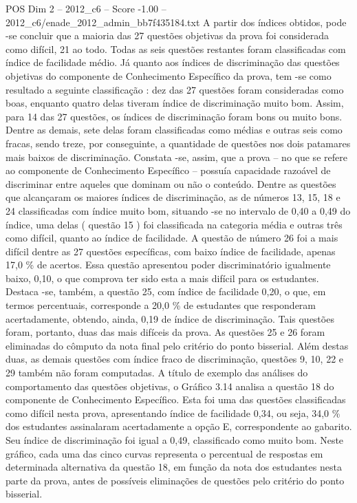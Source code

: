 \begin{textsample}{POS Dim 2 – 2012\_c6 – Score -1.00 – 2012\_c6/enade\_2012\_admin\_bb7f435184.txt}
A partir dos índices obtidos, pode -se concluir que a maioria das 27 questões objetivas da prova foi considerada como difícil, 21 ao todo.
Todas as seis questões restantes foram classificadas com índice de facilidade médio.
Já quanto aos índices de discriminação das questões objetivas do componente de Conhecimento Específico da prova, tem -se como resultado a seguinte classificação : dez das 27 questões foram consideradas como boas, enquanto quatro delas tiveram índice de discriminação muito bom.
Assim, para 14 das 27 questões, os índices de discriminação foram bons ou muito bons.
Dentre as demais, sete delas foram classificadas como médias e outras seis como fracas, sendo treze, por conseguinte, a quantidade de questões nos dois patamares mais baixos de discriminação.
Constata -se, assim, que a prova – no que se refere ao componente de Conhecimento Específico – possuía capacidade razoável de discriminar entre aqueles que dominam ou não o conteúdo.
Dentre as questões que alcançaram os maiores índices de discriminação, as de números 13, 15, 18 e 24 classificadas com índice muito bom, situando -se no intervalo de 0,40 a 0,49 do índice, uma delas ( questão 15 ) foi classificada na categoria média e outras três como difícil, quanto ao índice de facilidade.
A questão de número 26 foi a mais difícil dentre as 27 questões específicas, com baixo índice de facilidade, apenas 17,0 \% de acertos.
Essa questão apresentou poder discriminatório igualmente baixo, 0,10, o que comprova ter sido esta a mais difícil para os estudantes.
Destaca -se, também, a questão 25, com índice de facilidade 0,20, o que, em termos percentuais, corresponde a 20,0 \% de estudantes que responderam acertadamente, obtendo, ainda, 0,19 de índice de discriminação.
Tais questões foram, portanto, duas das mais difíceis da prova.
As questões 25 e 26 foram eliminadas do cômputo da nota final pelo critério do ponto bisserial.
Além destas duas, as demais questões com índice fraco de discriminação, questões 9, 10, 22 e 29 também não foram computadas.
A título de exemplo das análises do comportamento das questões objetivas, o Gráfico 3.14 analisa a questão 18 do componente de Conhecimento Específico.
Esta foi uma das questões classificadas como difícil nesta prova, apresentando índice de facilidade 0,34, ou seja, 34,0 \% dos estudantes assinalaram acertadamente a opção E, correspondente ao gabarito.
Seu índice de discriminação foi igual a 0,49, classificado como muito bom.
Neste gráfico, cada uma das cinco curvas representa o percentual de respostas em determinada alternativa da questão 18, em função da nota dos estudantes nesta parte da prova, antes de possíveis eliminações de questões pelo critério do ponto bisserial.

\end{textsample}
